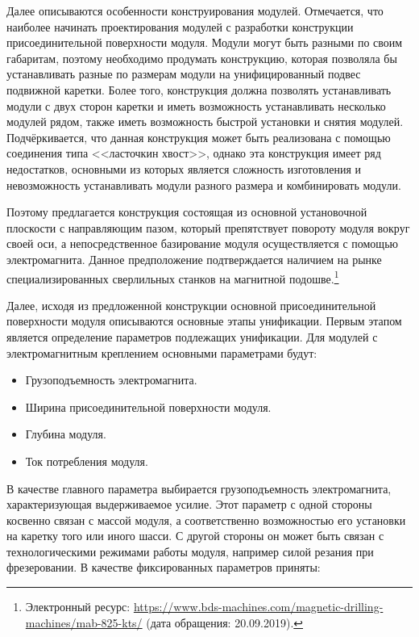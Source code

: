Далее описываются особенности конструирования модулей. Отмечается, что наиболее начинать проектирования модулей с разработки конструкции присоединительной поверхности модуля. Модули могут быть разными по своим габаритам, поэтому необходимо продумать конструкцию, которая позволяла бы устанавливать разные по размерам модули на унифицированный подвес подвижной каретки. Более того, конструкция должна позволять устанавливать модули с двух сторон каретки и иметь возможность устанавливать несколько модулей рядом, также иметь возможность быстрой установки и снятия модулей. Подчёркивается, что данная конструкция может быть реализована с помощью соединения типа <<ласточкин хвост>>, однако эта конструкция имеет ряд недостатков, основными из которых является сложность изготовления и невозможность устанавливать модули разного размера и комбинировать модули.

Поэтому предлагается конструкция состоящая из основной установочной плоскости с направляющим пазом, который препятствует повороту модуля вокруг своей оси, а непосредственное базирование модуля осуществляется с помощью электромагнита. Данное предположение подтверждается наличием на рынке специализированных сверлильных станков на магнитной подошве.\footnote{Электронный ресурс: {\tiny\url{https://www.bds-machines.com/magnetic-drilling-machines/mab-825-kts/}} (дата обращения: 20.09.2019).}

Далее, исходя из предложенной конструкции основной присоединительной поверхности модуля описываются основные этапы унификации. Первым этапом является определение параметров подлежащих унификации. Для модулей с электромагнитным креплением основными параметрами будут:

\begin{itemize}
	\item Грузоподъемность электромагнита.
	\item Ширина присоединительной поверхности модуля. 
	\item Глубина модуля.
	\item Ток потребления модуля.
\end{itemize}

В качестве главного параметра выбирается грузоподъемность электромагнита, характеризующая выдерживаемое усилие. Этот параметр с одной стороны косвенно связан с массой модуля, а соответственно возможностью его установки на каретку того или иного шасси. С другой стороны он может быть связан с технологическими режимами работы модуля, например силой резания при фрезеровании. В качестве фиксированных параметров приняты:

